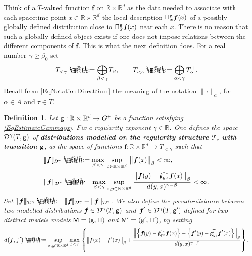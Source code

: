 \documentclass[10pt, reqno]{amsart}
\makeatletter
\numberwithin{subsection}{section}
\numberwithin{subsubsection}{subsection}
\numberwithin{equation}{section} %
\theoremstyle{mystyle}
\newtheorem{defn}[thm]{ \hspace{-0.31cm} {Definition}}%
\theoremstyle{mystyle2}
\theoremstyle{mystyle3}
\newcommand{\trino}[1]{|\!|\!|#1|\!|\!|}
\newcommand{\brarb}[1]{[\hspace{-0.5mm}]#1[\hspace{-0.5mm}]}
\newcommand{\bsf}{\boldsymbol{f}}
\newcommand{\ssk}{\smallskip}
\newcommand\bbR{\mathbb{R}}
\newcommand{\mcD}{\mathcal{D}}
\newcommand*{\defeq}{\mathrel{\rlap{%
                     \raisebox{0.3ex}{$\m@th\cdot$}}%
                     \raisebox{-0.3ex}{$\m@th\cdot$}}%
                     =}
\makeatother
\begin{document}
\medskip

Think of a $T$-valued function $\bsf$ on $\bbR\times\bbR^d$ as the data needed to associate with each spacetime point $x\in\bbR\times\bbR^d$ the local description ${\sf \Pi}^{\sf g}_x\bsf(x)$ of a possibly globally defined distribution close to ${\sf \Pi}^{\sf g}_x\bsf(x)$ near each $x$.  There is no reason that such a globally defined object exists if one does not impose relations between the different components of $\bsf$. This is what the next definition does. For a real number $\gamma\geq\beta_0$ set
\vspace{-0.1cm}$$
T_{<\gamma} \defeq  \bigoplus_{\beta<\gamma} T_\beta, \qquad T_{<\gamma}^+ \defeq  \bigoplus_{\alpha<\gamma} T_\alpha^+.
$$
Recall from \eqref{EqNotationDirectSum} the meaning of the notation $\|\tau\|_\alpha$, for $\alpha\in A$ and $\tau\in T$.

\ssk

\begin{defn} \label{DefnModelledDistribution}
Let ${\sf g} : \bbR\times\bbR^d\rightarrow G^+$ be a function satisfying \eqref{EqEstimateGammayx}. Fix a regularity exponent $\gamma\in\bbR$. One defines the space $\mcD^\gamma(T, {\sf g})$ of \textbf{\textsf{distributions modelled on the regularity structure $\mathscr{T}$, with transition ${\sf g}$}}, as the space of functions $\bsf : \bbR\times\bbR^d\rightarrow T_{<\gamma}$ such that
\begin{equation*}
\begin{split}
&\brarb{\bsf}_{\mcD^\gamma} \defeq  \max_{\beta<\gamma}\, \sup_{x\in \bbR\times\bbR^d}\, \big\| \bsf(x) \big\|_{\beta} < \infty,   \\
&\|\bsf\|_{\mcD^\gamma} \defeq  \max_{\beta<\gamma}\sup_{x,y\in \bbR\times\bbR^d}\frac{\big\| \bsf(y) - \widehat{{\sf g}_{yx}}\bsf(x) \big\|_{\beta}} 
{d(y,x)^{\gamma-\beta}} < \infty.
\end{split}
\end{equation*}
Set $\trino{\bsf}_{\mcD^\gamma} \defeq  \brarb{\bsf}_{\mcD^\gamma} + \|\bsf\|_{\mcD^\gamma}$. We also define the pseudo-distance between two modelled distributions $\bsf\in\mcD^\gamma(T,\sf g)$ and $\bsf'\in\mcD^\gamma(T,\sf g')$ defined for two distinct models models $\sf M=(g,\Pi)$ and $\sf M'=(g',\Pi')$, by setting
$$
d\big(\bsf,\bsf'\big) \defeq  \underset{x,y\in\bbR\times\bbR^d}{\sup}\,\underset{\beta<\gamma}{\max}\,\left\{ \big\|\bsf(x) - \bsf'(x)\big\|_\beta + \frac{\Big\| \Big\{\bsf(y)-\widehat{{\sf g}_{yx}}\bsf(x)\Big\} -  \Big\{\bsf'(y)-\widehat{{\sf g}'_{yx}}\bsf'(x)\Big\}\Big\|_\beta}{d(y,x)^{\gamma-\beta}}  \right\}.
$$
\end{defn}
\end{document}
